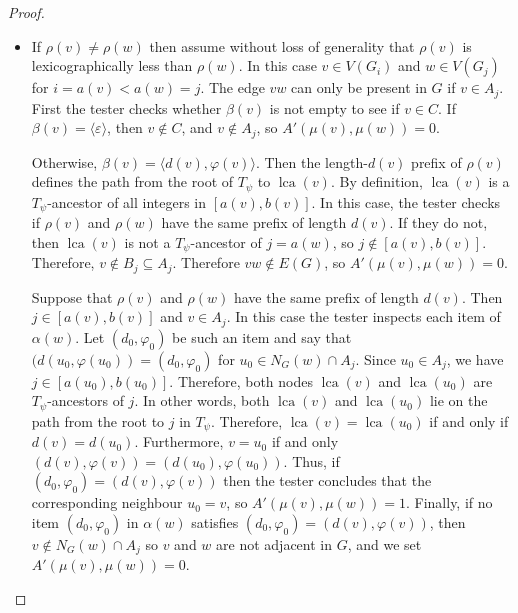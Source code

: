 \documentclass{patmorin}
\renewcommand{\ge}{\geqslant}
\DeclareMathOperator{\lca}{lca}
\begin{document}
\begin{proof}
\begin{itemize}
       \item If $\rho(v)\neq\rho(w)$ then assume without loss of generality that $\rho(v)$ is lexicographically less than $\rho(w)$.
       In this case $v\in V(G_i)$ and $w\in V(G_j)$ for $i=a(v)<a(w)=j$.
       The edge $vw$ can only be present in $G$ if $v\in A_j$.
       First the tester checks whether $\beta(v)$ is not empty to see if $v\in C$.
       If $\beta(v)=\langle\varepsilon\rangle$, then 
       $v\not\in C$, and  $v\not\in A_j$, so $A'(\mu(v),\mu(w))=0$.

       Otherwise, $\beta(v)=\langle d(v),\varphi(v)\rangle$.  Then the length-$d(v)$ prefix of $\rho(v)$ defines the path from the root of $T_\psi$ to $\lca(v)$.  By definition, $\lca(v)$ is a $T_\psi$-ancestor of all integers in $[a(v),b(v)]$. In this case, the tester checks if $\rho(v)$ and $\rho(w)$ have the same prefix of length $d(v)$.  If they do not, then $\lca(v)$ is not a $T_\psi$-ancestor of $j=a(w)$, so $j\not\in[a(v),b(v)]$.  Therefore, $v\not\in B_{j}\subseteq A_j$.
       Therefore $vw\not\in E(G)$, so $A'(\mu(v),\mu(w))=0$.

       Suppose that $\rho(v)$ and $\rho(w)$ have the same prefix of length $d(v)$.  Then $j\in [a(v),b(v)]$ and $v\in A_j$.
       In this case the tester inspects each item of $\alpha(w)$. Let $(d_0,\varphi_0)$ be such an item and say that $(d(u_0,\varphi(u_0))=(d_0,\varphi_0)$ for $u_0 \in N_G(w)\cap A_j$. 
       Since $u_0 \in A_j$, we have $j\in[a(u_0),b(u_0)]$. 
       Therefore, both nodes $\lca(v)$ and $\lca(u_0)$ are $T_\psi$-ancestors of $j$. In other words, both $\lca(v)$ and $\lca(u_0)$ lie on the path from the root to $j$ in $T_{\psi}$. 
       Therefore, $\lca(v)=\lca(u_0)$ if and only if $d(v)=d(u_0)$. Furthermore, $v=u_0$ if and only $(d(v),\varphi(v))=(d(u_0),\varphi(u_0))$. Thus, if $(d_0,\varphi_0)=(d(v),\varphi(v))$ then the tester concludes that the corresponding neighbour $u_0=v$, so $A'(\mu(v),\mu(w))=1$.
       Finally, if no item $(d_0,\varphi_0)$ in $\alpha(w)$ satisfies $(d_0,\varphi_0)=(d(v),\varphi(v))$, then $v\not\in N_G(w)\cap A_j$ so $v$ and $w$ are not adjacent in $G$, and we set $A'(\mu(v),\mu(w))=0$.
     \end{itemize}




\end{proof}
\end{document}

